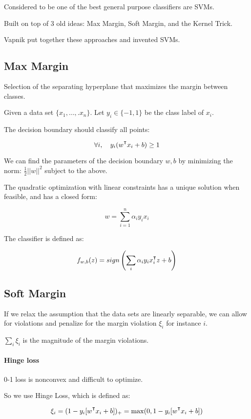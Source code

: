 \documentclass{idc_msc}
\renewcommand{\T}{{\mathpalette\raiseT\intercal}} %
\begin{document}
Considered to be one of the best general purpose classifiers are SVMs.

Built on top of 3 old ideas: Max Margin, Soft Margin, and the Kernel Trick.

Vapnik put together these approaches and invented SVMs.

\subsection{Max Margin}

Selection of the separating hyperplane that maximizes the margin between classes.

Given a data set \(\{x_1, \ldots,.x_n\}\).
Let \(y_i \in \{-1, 1\}\) be the class label of \(x_i\).

The decision boundary should classify all points:

\[\forall i, \quad y_i(w^\T x_i + b) \ge 1\]

We can find the parameters of the decision boundary \(w, b\) by minimizing the norm: \(\frac{1}{2}||w||^2\) subject to the above.

The quadratic optimization with linear constraints has a unique solution when feasible, and has a closed form:

\[w = \sum_{i = 1}^n \alpha_i y_i x_i\]

The classifier is defined as:

\[f_{w,b}(z) = sign\left(\sum_i \alpha_i y_i x_i^\T z + b \right)\]

\subsection{Soft Margin}

If we relax the assumption that the data sets are linearly separable, we can allow for violations and penalize for the margin violation \(\xi_i\) for instance \(i\).

\(\sum_i \xi_i\) is the magnitude of the margin violations.

\paragraph{Hinge loss}

0-1 loss is nonconvex and difficult to optimize.

So we use Hinge Loss, which is defined as:

\[\xi_i = (1 - y_i[w^\T x_i + b])_+ = \max (0, 1 - y_i[w^\T x_i + b])\]
\end{document}
